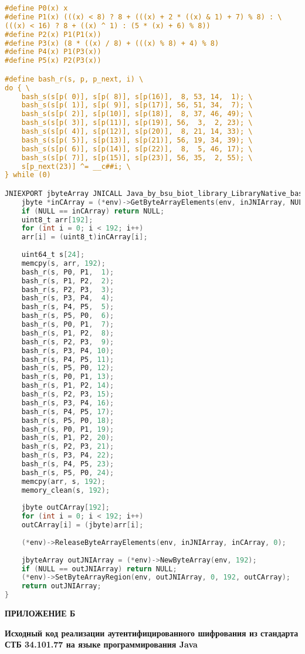 \begin{lstlisting}[language=C, label=bash-code]
#define P0(x) x
#define P1(x) (((x) < 8) ? 8 + (((x) + 2 * ((x) & 1) + 7) % 8) : \
(((x) < 16) ? 8 + ((x) ^ 1) : (5 * (x) + 6) % 8))
#define P2(x) P1(P1(x))
#define P3(x) (8 * ((x) / 8) + (((x) % 8) + 4) % 8)
#define P4(x) P1(P3(x))
#define P5(x) P2(P3(x))

#define bash_r(s, p, p_next, i) \
do { \
	bash_s(s[p( 0)], s[p( 8)], s[p(16)],  8, 53, 14,  1); \
	bash_s(s[p( 1)], s[p( 9)], s[p(17)], 56, 51, 34,  7); \
	bash_s(s[p( 2)], s[p(10)], s[p(18)],  8, 37, 46, 49); \
	bash_s(s[p( 3)], s[p(11)], s[p(19)], 56,  3,  2, 23); \
	bash_s(s[p( 4)], s[p(12)], s[p(20)],  8, 21, 14, 33); \
	bash_s(s[p( 5)], s[p(13)], s[p(21)], 56, 19, 34, 39); \
	bash_s(s[p( 6)], s[p(14)], s[p(22)],  8,  5, 46, 17); \
	bash_s(s[p( 7)], s[p(15)], s[p(23)], 56, 35,  2, 55); \
	s[p_next(23)] ^= __c##i; \
} while (0)

JNIEXPORT jbyteArray JNICALL Java_by_bsu_biot_library_LibraryNative_bash_1f(JNIEnv *env, jclass thisClass, jbyteArray inJNIArray) {
	jbyte *inCArray = (*env)->GetByteArrayElements(env, inJNIArray, NULL);
	if (NULL == inCArray) return NULL;
	uint8_t arr[192];
	for (int i = 0; i < 192; i++)
	arr[i] = (uint8_t)inCArray[i];
	
	uint64_t s[24];
	memcpy(s, arr, 192);
	bash_r(s, P0, P1,  1);
	bash_r(s, P1, P2,  2);
	bash_r(s, P2, P3,  3);
	bash_r(s, P3, P4,  4);
	bash_r(s, P4, P5,  5);
	bash_r(s, P5, P0,  6);
	bash_r(s, P0, P1,  7);
	bash_r(s, P1, P2,  8);
	bash_r(s, P2, P3,  9);
	bash_r(s, P3, P4, 10);
	bash_r(s, P4, P5, 11);
	bash_r(s, P5, P0, 12);
	bash_r(s, P0, P1, 13);
	bash_r(s, P1, P2, 14);
	bash_r(s, P2, P3, 15);
	bash_r(s, P3, P4, 16);
	bash_r(s, P4, P5, 17);
	bash_r(s, P5, P0, 18);
	bash_r(s, P0, P1, 19);
	bash_r(s, P1, P2, 20);
	bash_r(s, P2, P3, 21);
	bash_r(s, P3, P4, 22);
	bash_r(s, P4, P5, 23);
	bash_r(s, P5, P0, 24);
	memcpy(arr, s, 192);
	memory_clean(s, 192);
	
	jbyte outCArray[192];
	for (int i = 0; i < 192; i++)
	outCArray[i] = (jbyte)arr[i];
	
	(*env)->ReleaseByteArrayElements(env, inJNIArray, inCArray, 0);
	
	jbyteArray outJNIArray = (*env)->NewByteArray(env, 192);
	if (NULL == outJNIArray) return NULL;
	(*env)->SetByteArrayRegion(env, outJNIArray, 0, 192, outCArray);
	return outJNIArray;
}
\end{lstlisting}


\newpage

\begin{flushright}{\bf \Large ПРИЛОЖЕНИЕ Б}\end{flushright}
\begin{center}
{\bf Исходный код реализации аутентифицированного шифрования из стандарта СТБ 34.101.77 
	на языке программирования Java}
\end{center}

